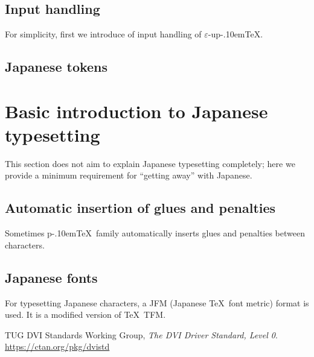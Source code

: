 \documentclass[a4paper,11pt]{article}
\def\eupTeX{$\varepsilon$-\upTeX}\def\upTeX{u\pTeX}
\def\pTeX{p\kern-.10em\TeX}
\begin{document}

\subsection{Input handling}

For simplicity, first we introduce of input handling of \eupTeX.


\subsection{Japanese tokens}

\section{Basic introduction to Japanese typesetting}

This section does not aim to explain Japanese typesetting completely;
here we provide a minimum requirement for ``getting away'' with Japanese.

\subsection{Automatic insertion of glues and penalties}

Sometimes \pTeX\ family automatically inserts glues and penalties
between characters.

\subsection{Japanese fonts}

For typesetting Japanese characters, a JFM (Japanese \TeX\ font metric)
format is used. It is a modified version of \TeX\ TFM.



\newpage

\begin{thebibliography}{99}
  TUG DVI Standards Working Group,
  \textit{The DVI Driver Standard, Level 0}.\\
  \url{https://ctan.org/pkg/dvistd}
\end{thebibliography}

\newpage
\printindex
\end{document}
